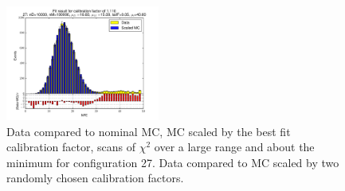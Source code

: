 \begin{figure}[htbp]
\begin{center}
\includegraphics[width=0.45\textwidth]{../FIGURES/27/FIG_Fit_result_for_calibration_factor_of_1_110.pdf} 
\caption{Data compared to nominal MC, MC scaled by the best fit calibration factor, scans of $\chi^2$ over a large range and about the minimum for configuration 27. Data compared to MC scaled by two randomly chosen calibration factors.} 
\label{tab:best_27} 
\end{center} \end{figure} 

